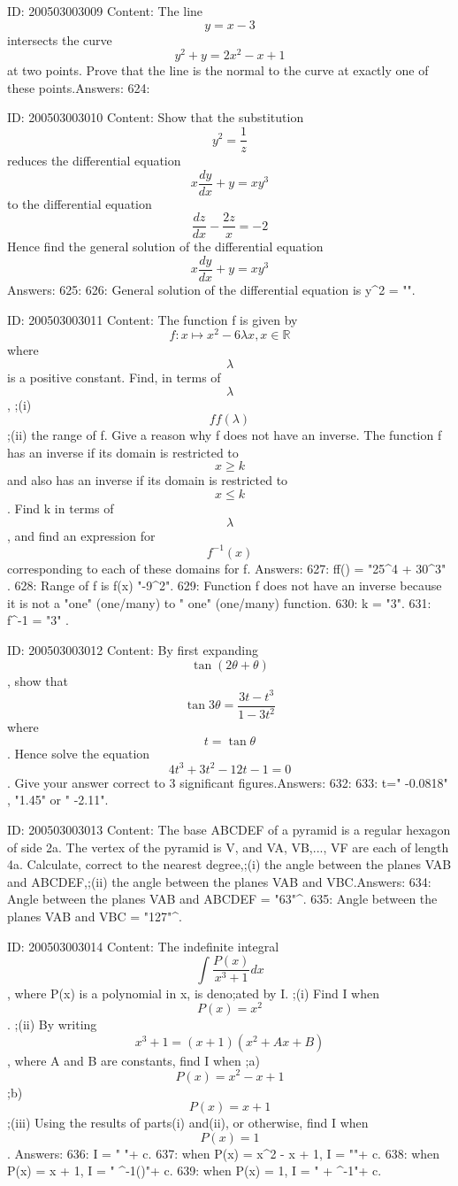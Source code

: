 \documentclass{article}
\begin{document}
ID: 200503003009
Content:
The line $$y = x - 3$$ intersects the curve $$y^2 + y = 2 x^2 - x + 1$$  at two points. Prove that the line is the normal to the curve at exactly one of these points.Answers:
624: 

ID: 200503003010
Content:
Show that the substitution $$y^2 = \frac{1}{z}$$ reduces the differential equation $$x\frac{dy}{dx} + y = x y^3$$  to the differential equation $$\frac{dz}{dx} - \frac{2z}{x} = - 2$$ Hence find the general solution of the differential equation $$x\frac{dy}{dx} + y = xy^{3}$$ Answers:
625: 
626: General solution of the differential equation is y^2 = "".

ID: 200503003011
Content:
The function f is given by $$f : x \mapsto x^2 - 6\lambda x, x \in \mathbb{R}$$ where $$\lambda$$ is a positive constant. Find, in terms of $$\lambda$$, ;(i) $$ff(\lambda)$$;(ii) the range of f. Give a reason why f does not have an inverse. The function f has an inverse if its domain is restricted to $$x \geq k$$ and also has an inverse if its domain is restricted to $$x \leq k$$. Find k in terms of $$\lambda$$, and find an expression for $$f^{- 1} ( x )$$ corresponding to each of these domains for f. Answers:
627: ff(\lambda) = "25\lambda^{4} + 30\lambda^{3}" .
628: Range of f is f(x) \geq "-9\lambda^{2}".
629: Function f does not have an inverse because it is not a "one" (one/many) to " one" (one/many) function.
630: k = "3\lambda".
631: f^{-1} = "3\lambda\pm{}" .

ID: 200503003012
Content:
By first expanding $$\tan  ( 2\theta + \theta )$$, show that $$\tan  3\theta = \frac{3t - t^3}{1 - 3 t^2}$$ where $$t = \tan  \theta$$. Hence solve the equation $$4 t^3 + 3 t^2 - 12t - 1 = 0$$. Give your answer correct to 3 significant figures.Answers:
632: 
633: t=" -0.0818" , "1.45" or " -2.11".

ID: 200503003013
Content:
The base ABCDEF of a pyramid is a regular hexagon of side 2a. The vertex of the pyramid is V, and VA, VB,..., VF are each of length 4a. Calculate, correct to the nearest degree,;(i) the angle between the planes VAB and ABCDEF,;(ii) the angle between the planes VAB and VBC.Answers:
634: Angle between the planes VAB and ABCDEF = "63"^{\circ}.
635: Angle between the planes VAB and VBC = "127"^{\circ}.

ID: 200503003014
Content:
The indefinite integral $$\int \frac{P( x )}{x^3 + 1} dx$$, where P(x) is a polynomial in x, is deno;ated by I. ;(i) Find I when $$P( x ) = x^2$$. ;(ii) By writing $$x^3 + 1 = ( x + 1 )( x^2 + Ax + B )$$, where A and B are constants, find I when ;a)$$P(x) = x^2 - x + 1$$ ;b)$$P(x) = x + 1$$;(iii) Using the results of parts(i) and(ii), or otherwise, find I when $$P(x) = 1$$. Answers:
636: I = " "+ c.
637: when P(x) = x^2 - x + 1, I = ""+ c.
638: when P(x) = x + 1, I = "  \tan^{-1}{\left(\right)}"+ c.
639: when P(x) = 1, I = "  + \tan^{-1}{}"+ c.
\end{document}
